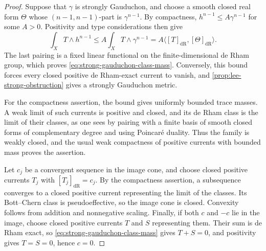 \begin{proof}
Suppose that $\gamma$ is strongly Gauduchon, and choose a smooth closed real form $\Theta$ whose $(n-1,n-1)$-part is $\gamma^{n-1}$. By compactness, $h^{n-1}\leq A\gamma^{n-1}$ for some $A>0$. Positivity and type considerations then give
\[
 \int_XT\wedge h^{n-1}
 \leq A\int_XT\wedge\gamma^{n-1}
 =A\langle[T]_{\mathrm{dR}},[\Theta]_{\mathrm{dR}}\rangle.
\]
The last pairing is a fixed linear functional on the finite-dimensional de Rham group, which proves \eqref{eq:strong-gauduchon-class-mass}. Conversely, this bound forces every closed positive de Rham-exact current to vanish, and \cref{prop:lee-strong-obstruction} gives a strongly Gauduchon metric.

For the compactness assertion, the bound gives uniformly bounded trace masses. A weak limit of such currents is positive and closed, and its de Rham class is the limit of their classes, as one sees by pairing with a finite basis of smooth closed forms of complementary degree and using Poincar\'e duality. Thus the family is weakly closed, and the usual weak compactness of positive currents with bounded mass proves the assertion.

Let $c_j$ be a convergent sequence in the image cone, and choose closed positive currents $T_j$ with $[T_j]_{\mathrm{dR}}=c_j$. By the compactness assertion, a subsequence converges to a closed positive current representing the limit of the classes. Its Bott--Chern class is pseudoeffective, so the image cone is closed. Convexity follows from addition and nonnegative scaling. Finally, if both $c$ and $-c$ lie in the image, choose closed positive currents $T$ and $S$ representing them. Their sum is de Rham exact, so \eqref{eq:strong-gauduchon-class-mass} gives $T+S=0$, and positivity gives $T=S=0$, hence $c=0$.
\end{proof}

